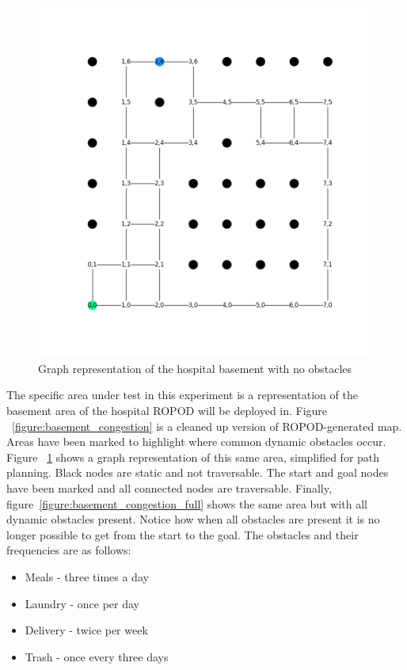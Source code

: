   \begin{figure}[!htb]
    \centering
    \includegraphics[width=\linewidth]{images/results/Empty_Hospital.png}
    \caption{Graph representation of the hospital basement with no obstacles}
    \label{figure:basement_congestion_empty}
  \end{figure}

  The specific area under test in this experiment is a representation
  of the basement area of the hospital ROPOD will be deployed in. Figure
  ~\ref{figure:basement_congestion}
  is a cleaned up version of ROPOD-generated map. Areas have been marked
  to highlight where common dynamic obstacles occur. Figure
  ~\ref{figure:basement_congestion_empty} shows a graph
  representation of this same area, simplified for path planning. Black nodes
  are static and not traversable. The start and goal nodes have been marked
  and all connected nodes are traversable. Finally,
  figure~\ref{figure:basement_congestion_full}
  shows the same area but with all dynamic obstacles present. Notice how when
  all obstacles are present it is no longer possible to get from the start
  to the goal. The obstacles and their frequencies are as follows: \\

  \begin{itemize}

    \item Meals - three times a day

    \item Laundry - once per day

    \item Delivery - twice per week

    \item Trash - once every three days

  \end{itemize}

